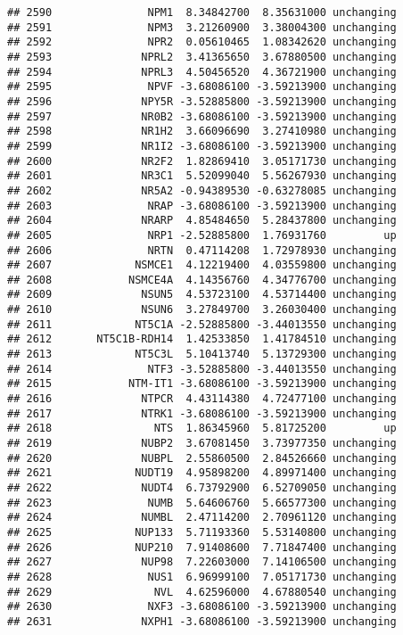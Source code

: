 \documentclass[]{article}
\begin{document}
\begin{verbatim}
## 2590               NPM1  8.34842700  8.35631000 unchanging
## 2591               NPM3  3.21260900  3.38004300 unchanging
## 2592               NPR2  0.05610465  1.08342620 unchanging
## 2593              NPRL2  3.41365650  3.67880500 unchanging
## 2594              NPRL3  4.50456520  4.36721900 unchanging
## 2595               NPVF -3.68086100 -3.59213900 unchanging
## 2596              NPY5R -3.52885800 -3.59213900 unchanging
## 2597              NR0B2 -3.68086100 -3.59213900 unchanging
## 2598              NR1H2  3.66096690  3.27410980 unchanging
## 2599              NR1I2 -3.68086100 -3.59213900 unchanging
## 2600              NR2F2  1.82869410  3.05171730 unchanging
## 2601              NR3C1  5.52099040  5.56267930 unchanging
## 2602              NR5A2 -0.94389530 -0.63278085 unchanging
## 2603               NRAP -3.68086100 -3.59213900 unchanging
## 2604              NRARP  4.85484650  5.28437800 unchanging
## 2605               NRP1 -2.52885800  1.76931760         up
## 2606               NRTN  0.47114208  1.72978930 unchanging
## 2607             NSMCE1  4.12219400  4.03559800 unchanging
## 2608            NSMCE4A  4.14356760  4.34776700 unchanging
## 2609              NSUN5  4.53723100  4.53714400 unchanging
## 2610              NSUN6  3.27849700  3.26030400 unchanging
## 2611             NT5C1A -2.52885800 -3.44013550 unchanging
## 2612       NT5C1B-RDH14  1.42533850  1.41784510 unchanging
## 2613             NT5C3L  5.10413740  5.13729300 unchanging
## 2614               NTF3 -3.52885800 -3.44013550 unchanging
## 2615            NTM-IT1 -3.68086100 -3.59213900 unchanging
## 2616              NTPCR  4.43114380  4.72477100 unchanging
## 2617              NTRK1 -3.68086100 -3.59213900 unchanging
## 2618                NTS  1.86345960  5.81725200         up
## 2619              NUBP2  3.67081450  3.73977350 unchanging
## 2620              NUBPL  2.55860500  2.84526660 unchanging
## 2621             NUDT19  4.95898200  4.89971400 unchanging
## 2622              NUDT4  6.73792900  6.52709050 unchanging
## 2623               NUMB  5.64606760  5.66577300 unchanging
## 2624              NUMBL  2.47114200  2.70961120 unchanging
## 2625             NUP133  5.71193360  5.53140800 unchanging
## 2626             NUP210  7.91408600  7.71847400 unchanging
## 2627              NUP98  7.22603000  7.14106500 unchanging
## 2628               NUS1  6.96999100  7.05171730 unchanging
## 2629                NVL  4.62596000  4.67880540 unchanging
## 2630               NXF3 -3.68086100 -3.59213900 unchanging
## 2631              NXPH1 -3.68086100 -3.59213900 unchanging

\end{verbatim}
\end{document}
